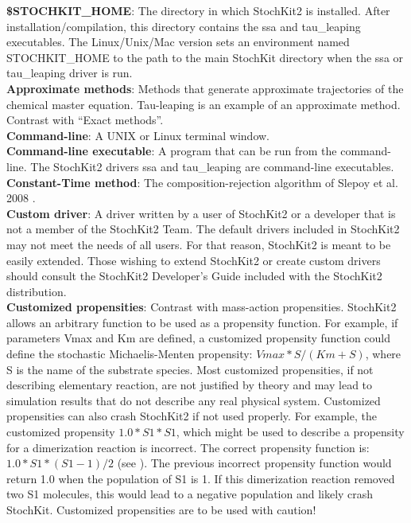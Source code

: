 \documentclass[11pt,letterpaper]{article}
\begin{document}
\textbf{\$STOCHKIT\_HOME}: The directory in which StochKit2 is installed.  After installation/compilation, this directory contains the ssa and tau\_leaping executables.  The Linux/Unix/Mac version sets an environment named STOCHKIT\_HOME to the path to the main StochKit directory when the ssa or tau\_leaping driver is run.
\\\textbf{Approximate methods}: Methods that generate approximate trajectories of the chemical master equation.  Tau-leaping is an example of an approximate method.  Contrast with “Exact methods”.
\\\textbf{Command-line}: A UNIX or Linux terminal window.
\\\textbf{Command-line executable}: A program that can be run from the command-line.  The StochKit2 drivers ssa and tau\_leaping are command-line executables.
\\\textbf{Constant-Time method}: The composition-rejection algorithm of Slepoy et al. 2008 \cite{Slepoy2008}.
\\\textbf{Custom driver}: A driver written by a user of StochKit2 or a developer that is not a member of the StochKit2 Team.  The default drivers included in StochKit2 may not meet the needs of all users.  For that reason, StochKit2 is meant to be easily extended.  Those wishing to extend StochKit2 or create custom drivers should consult the StochKit2 Developer's Guide included with the StochKit2 distribution.
\\\textbf{Customized propensities}: Contrast with mass-action propensities.  StochKit2 allows an arbitrary function to be used as a propensity function.  For example, if parameters Vmax and Km are defined, a customized propensity function could define the stochastic Michaelis-Menten propensity: $Vmax*S/(Km+S)$, where S is the name of the substrate species.  Most customized propensities, if not describing elementary reaction, are not justified by theory and may lead to simulation results that do not describe any real physical system.  Customized propensities can also crash StochKit2 if not used properly.  For example, the customized propensity $1.0*S1*S1$, which might be used to describe a propensity for a dimerization reaction is incorrect.  The correct propensity function is: $1.0*S1*(S1-1)/2$ (see \cite{Gillespie1977}).  The previous incorrect propensity function would return 1.0 when the population of S1 is 1.  If this dimerization reaction removed two S1 molecules, this would lead to a negative population and likely crash StochKit.  Customized propensities are to be used with caution!
\end{document}
